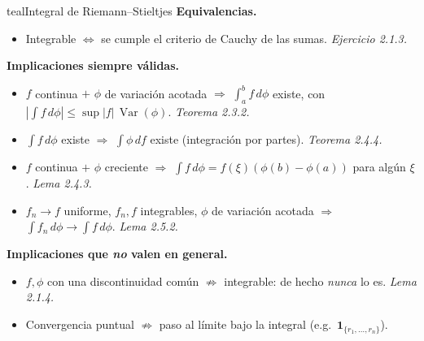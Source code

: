 \documentclass[11pt,twoside]{article}
\DeclareMathOperator{\Var}{Var}
\newcommand{\ind}{\mathbf{1}}                 %
\begin{document}
\begin{equivbox}{teal}{Integral de Riemann--Stieltjes}
\textbf{Equivalencias.}
\begin{itemize}[leftmargin=2em,itemsep=2pt]
\item Integrable $\Leftrightarrow$ se cumple el criterio de Cauchy de las sumas. \hfill\textit{Ejercicio 2.1.3.}
\end{itemize}
\textbf{Implicaciones siempre v\'alidas.}
\begin{itemize}[leftmargin=2em,itemsep=2pt]
\item $f$ continua $+$ $\phi$ de variaci\'on acotada $\Rightarrow$ $\int_{a}^{b} f\,d\phi$ existe, con $|\int f\,d\phi| \leq \sup|f|\,\Var(\phi)$. \hfill\textit{Teorema 2.3.2.}
\item $\int f\,d\phi$ existe $\Rightarrow$ $\int \phi\,df$ existe (integraci\'on por partes). \hfill\textit{Teorema 2.4.4.}
\item $f$ continua $+$ $\phi$ creciente $\Rightarrow$ $\int f\,d\phi = f(\xi)(\phi(b) - \phi(a))$ para alg\'un $\xi$. \hfill\textit{Lema 2.4.3.}
\item $f_{n} \to f$ uniforme, $f_{n}, f$ integrables, $\phi$ de variaci\'on acotada $\Rightarrow$ $\int f_{n}\,d\phi \to \int f\,d\phi$. \hfill\textit{Lema 2.5.2.}
\end{itemize}
\textbf{Implicaciones que \emph{no} valen en general.}
\begin{itemize}[leftmargin=2em,itemsep=2pt]
\item $f, \phi$ con una discontinuidad com\'un $\not\Rightarrow$ integrable: de hecho \emph{nunca} lo es. \hfill\textit{Lema 2.1.4.}
\item Convergencia puntual $\not\Rightarrow$ paso al l\'imite bajo la integral (e.g.\ $\ind_{\{r_{1},\dots,r_{n}\}}$).
\end{itemize}
\end{equivbox}

\medskip
\end{document}
